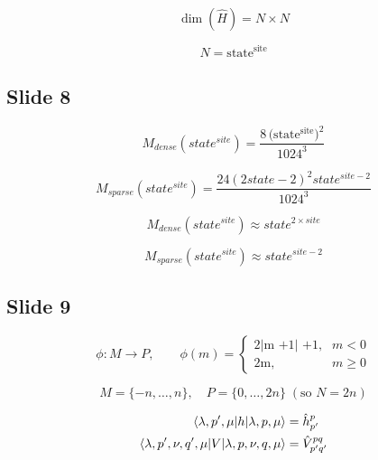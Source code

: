 \documentclass[a4paper,11pt]{article}
\begin{document}
\begin{equation}
\dim(\hat H) = N \times N
\end{equation}

\begin{equation}
N = \mathrm{state}^{\mathrm{site}}
\end{equation}


\subsection*{Slide 8}

\begin{equation}
M_{dense}(state^{site}) = \frac{8 \,\bigl(\mathrm{state}^{\mathrm{site}}\bigr)^{2}}{1024^{3}}
\end{equation}

\begin{equation}
M_{sparse}(state^{site}) = \frac{24(2state - 2)^{2} state^{site - 2}}{1024^{3}}
\end{equation}

\begin{equation}
M_{dense}(state^{site}) \approx state^{2 \times site}
\end{equation}

\begin{equation}
M_{sparse}(state^{site}) \approx state^{site - 2}
\end{equation}


\subsection*{Slide 9}

\begin{equation}
    \phi : M \longrightarrow P, \qquad
    \phi(m) =
    \begin{cases}
    \text{2|m +1| +1}, & m<0\\[6pt]
    \text{2m}, & m\ge 0
    \end{cases}
\end{equation}

\begin{equation}
M = \{-n,\dots,n\}, \quad
P = \{0,\dots,2n\} \;(\text{so } N=2n)
\end{equation}

\begin{align}
  \braket{\lambda, p', \mu|h|\lambda, p, \mu} &= \hat{h}^{p}_{p'} \\
  \braket{\lambda, p', \nu, q', \mu|V|\lambda, p, \nu, q, \mu} &= \hat{V}^{pq}_{p'q'} \\
\end{align}
\end{document}
